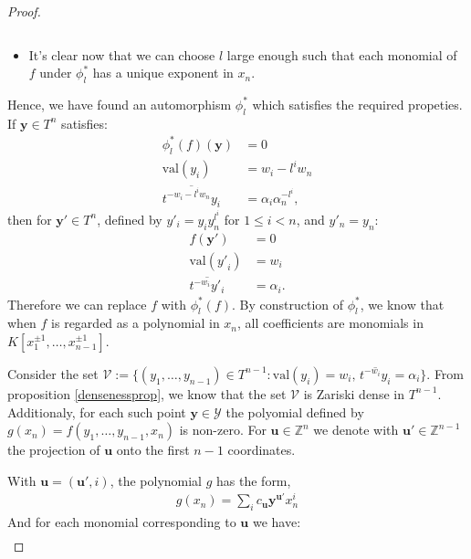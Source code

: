 \begin{proof}
\begin{itemize}
\[                \]
            \item It's clear now that we can choose $l$ large enough such that each monomial of $f$ under $\phi^{*}_{l}$ has a unique exponent in $x_{n}$.
        \end{itemize}
        \par Hence, we have found an automorphism $\phi^{*}_{l}$ which satisfies the required propeties. If $\textbf{y}\in T^{n}$ satisfies:
        \begin{align*}
            \phi^{*}_{l}(f)(\textbf{y}) &= 0\\
            \text{val}({y}_{i}) &= w_{i} - l^{i}w_{n} \\
            \overline{t^{-w_{i}- l^{i}w_{n}}y_{i}} &= \alpha_{i}\alpha_{n}^{-l^{i}},
        \end{align*}
        then for  $\textbf{y}'\in T^{n}$, defined by $y'_{i}=y_{i}y_{n}^{l^{i}}$ for $1\leq i<n$, and $y'_{n}  = y_{n}$:
        \begin{align*}
            f(\textbf{y}') &= 0\\
            \text{val}({y'}_{i}) &= w_{i} \\
            \overline{t^{-w_{i}}y'_{i}} &= \alpha_{i}.
        \end{align*}
        Therefore we can replace $f$ with $\phi^{*}_{l}(f)$.
        By construction of $\phi^{*}_{l}$, we know that when $f$ is regarded as a polynomial in $x_{n}$, all coefficients are monomials in $ K[x_{1}^{\pm1}, \dots, x_{n-1}^{\pm1}]$.
        \par Consider the set $\mathcal{V} := \{(y_{1},\dots, y_{n-1})\in T^{n-1}: \text{val}(y_{i}) = w_{i},\,\overline{ t^{-w_{i}}y_{i}} = \alpha_{i} \}$.
        From proposition \ref{densenessprop}, we know that the set $\mathcal{V}$ is Zariski dense in $T^{n-1}$.
        Additionaly, for each such point $\textbf{y}\in \mathcal{Y}$ the polyomial defined by $g(x_{n}) = f(y_{1},\dots, y_{n-1}, x_{n})$ is non-zero.
        For $\textbf{u} \in \mathbb{Z}^{n}$ we denote with $\textbf{u}'\in \mathbb{Z}^{n-1}$ the projection of $\textbf{u}$ onto the first $n-1$ coordinates. 
        \par With $\textbf{u} = (\textbf{u}',i)$, the polynomial $g$ has the form,
        \begin{align*}
            g(x_{n}) = \sum_{i} c_{\textbf{u}}\textbf{y}^{\textbf{u}'}x_{n}^{i}
        \end{align*}
        And for each monomial corresponding to $\textbf{u}$ we have:
        \begin{align*}

\end{align*}
\end{proof}
